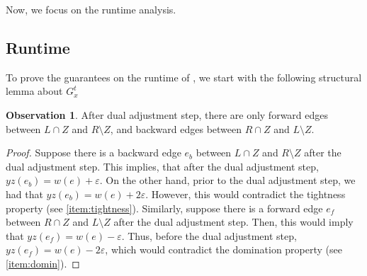 \documentclass[a4paper,11pt]{article}
\newcommand{\eps}{\varepsilon}
\theoremstyle{definition}
\theoremstyle{definition}
\theoremstyle{definition}
\theoremstyle{definition}
\theoremstyle{definition}
\theoremstyle{definition}
\theoremstyle{definition}
\newtheorem{observation2}[definition2]{Observation}
\theoremstyle{definition}
\theoremstyle{definition}
\theoremstyle{definition}
\theoremstyle{definition}
\theoremstyle{definition}
\theoremstyle{definition}
\theoremstyle{definition}
\theoremstyle{definition}
\begin{document}
Now, we focus on the runtime analysis.

\subsection{Runtime}
To prove the guarantees on the runtime of , we start with the following structural lemma about $G^t_x$

\begin{observation2}\label{obs:addingedges}
    After dual adjustment step, there are only forward edges between $L\cap Z$ and $R\setminus Z$, and backward edges between $R\cap Z$ and $L\setminus Z$.
\end{observation2}
\begin{proof}
Suppose there is a backward edge $e_b$ between $L\cap Z$ and $R\setminus Z$ after the dual adjustment step. This implies, that after the dual adjustment step, $yz(e_b)=w(e)+\eps$. On the other hand, prior to the dual adjustment step, we had that $yz(e_b)=w(e)+2\eps$. However, this would contradict the tightness property (see \ref{item:tightness}). Similarly, suppose there is a forward edge $e_f$ between $R\cap Z$ and $L\setminus Z$ after the dual adjustment step. Then, this would imply that $yz(e_f)=w(e)-\eps$. Thus, before the dual adjustment step, $yz(e_f)=w(e)-2\eps$, which would contradict the domination property (see \ref{item:domin}).
\end{proof}
\end{document}
